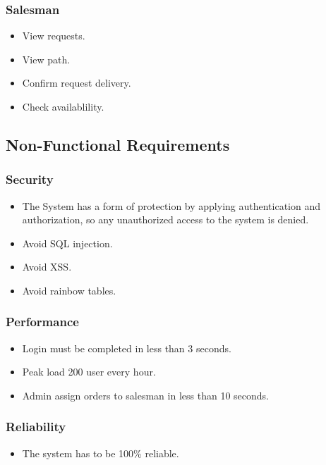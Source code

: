 \documentclass[12pt]{article}
\begin{document}
\subsubsection{ Salesman }
\begin{itemize}
	\item View requests.
	\item View path.
	\item Confirm request delivery.
	\item Check availablility.
\end{itemize}
\newpage

\subsection{ Non-Functional Requirements }

\subsubsection{ Security }
\begin{itemize}
	\item The System has a form of protection by applying authentication and authorization, so any unauthorized access to the system is denied.
	\item Avoid SQL injection.
	\item Avoid XSS.
	\item Avoid rainbow tables.
\end{itemize}

\subsubsection{ Performance }
\begin{itemize}
	\item Login must be completed in less than 3 seconds.
	\item Peak load 200 user every hour.
	\item Admin assign orders to salesman in less than 10 seconds.
\end{itemize}

\subsubsection{ Reliability }
\begin{itemize}
	\item The system has to be 100\% reliable.
\end{itemize}
\end{document}
